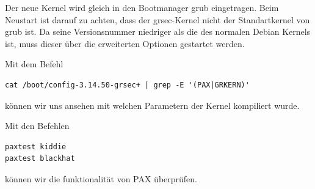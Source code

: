 \documentclass[parskip=full-]{scrartcl}
\begin{document}
Der neue Kernel wird gleich in den Bootmanager grub eingetragen. Beim Neustart ist darauf zu achten, dass der grsec-Kernel nicht der Standartkernel von grub ist. Da seine Versionsnummer niedriger als die des normalen Debian Kernels ist, muss dieser über die erweiterten Optionen gestartet werden.

Mit dem Befehl
\begin{lstlisting}
cat /boot/config-3.14.50-grsec+ | grep -E '(PAX|GRKERN)'
\end{lstlisting}
können wir uns ansehen mit welchen Parametern der Kernel kompiliert wurde.

Mit den Befehlen
\begin{lstlisting}
paxtest kiddie
paxtest blackhat
\end{lstlisting}
können wir die funktionalität von PAX überprüfen.
\end{document}
